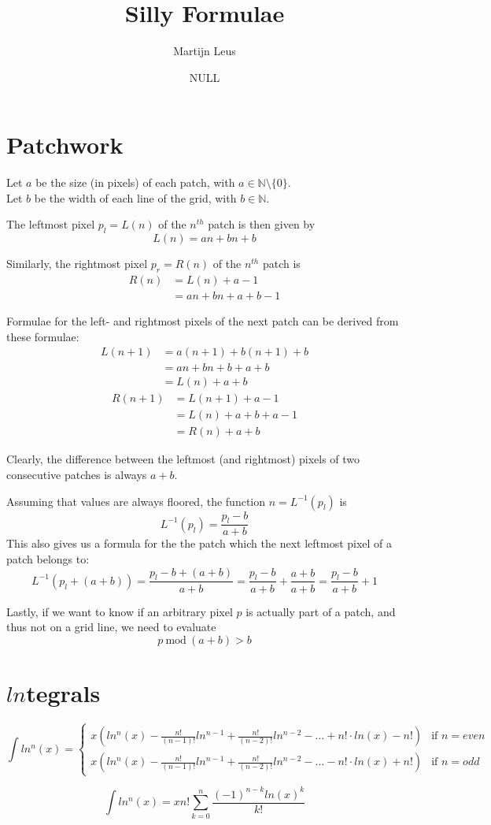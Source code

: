 \documentclass{article}
\begin{document}
\title{Silly Formulae}
\author{Martijn Leus}
\date{NULL}

\maketitle

\section{Patchwork}

Let $a$ be the size (in pixels) of each patch, with $a\in\mathbb{N}\setminus\{0\}$.\\
Let $b$ be the width of each line of the grid, with $b\in\mathbb{N}$.

The leftmost pixel $p_l=L(n)$ of the $n^{th}$ patch is then given by
$$L(n)=an + bn + b$$

Similarly, the rightmost pixel  $p_r=R(n)$ of the $n^{th}$ patch is
\begin{align*}
	R(n) &= L(n) + a - 1 \\
	&= an + bn + a + b - 1
\end{align*}

Formulae for the left- and rightmost pixels of the next patch can be derived from these formulae:
\begin{align*}
	L(n+1) &=a(n+1) + b(n+1) + b \\
	&= an + bn + b + a + b \\
	&= L(n) + a + b
\end{align*}
\begin{align*}
	R(n+1) &=L(n+1) + a - 1 \\
	&= L(n) + a + b + a - 1 \\
	&= R(n) + a + b
\end{align*}

Clearly, the difference between the leftmost (and rightmost) pixels of two consecutive patches is always $a + b$.

Assuming that values are always floored, the function $n=L^{-1}(p_l)$ is
$$L^{-1}(p_l)={\frac{p_l-b}{a+b}}$$
This also gives us a formula for the the patch which the next leftmost pixel of a patch belongs to:
$$L^{-1}(p_l + (a + b))=\frac{p_l-b+(a+b)}{a+b}=\frac{p_l-b}{a+b}+\frac{a+b}{a+b}=\frac{p_l-b}{a+b}+1$$

Lastly, if we want to know if an arbitrary pixel $p$ is actually part of a patch, and thus not on a grid line, we need to evaluate
$$p\>\mathrm{mod}\>(a + b) > b$$

\section{$ln$tegrals}
$$\int ln^n(x)=
\begin{cases}
x(ln^n(x)-\frac{n!}{(n-1)!}ln^{n-1}+\frac{n!}{(n-2)!}ln^{n-2}-...+n!\cdot ln(x)-n!) & \text{if } n=even \\ 
x(ln^n(x)-\frac{n!}{(n-1)!}ln^{n-1}+\frac{n!}{(n-2)!}ln^{n-2}-...-n!\cdot ln(x)+n!) & \text{if } n=odd
\end{cases}$$

$$\int ln^n(x)=xn!\sum_{k=0}^{n}\frac{(-1)^{n-k}ln(x)^k}{k!}$$
\end{document}
